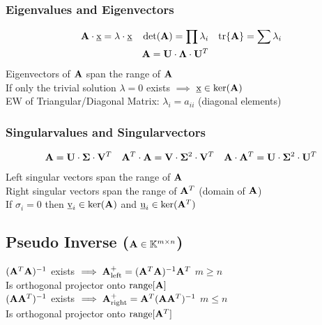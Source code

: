 \begin{mdframed}[style=eqbox]
\subsubsection{Eigenvalues and Eigenvectors}
\begin{align*}
  \mathbf{A} \cdot \underbar{x} = \lambda \cdot \underbar{x} && \det(\mathbf{A}) = \prod \lambda_i && \text{tr}\{\mathbf{A}\} = \sum \lambda_i\\
  &&\mathbf{A} = \mathbf{U} \cdot \mathbf{\Lambda} \cdot \mathbf{U}^{T}&&
\end{align*}
Eigenvectors of $\mathbf{A}$ span the range of $\mathbf{A}$\\
If only the trivial solution $\lambda = 0$ exists $\implies$ $\underbar{x} \in \text{ker}(\mathbf{A})$\\[0.25em]
EW of Triangular/Diagonal Matrix: $\lambda_i = a_{ii}$ (diagonal elements)

\subsubsection{Singularvalues and Singularvectors}
\begin{align*}
  \mathbf{A} = \mathbf{U} \cdot \mathbf{\Sigma} \cdot \mathbf{V}^{T} && \mathbf{A}^{T} \cdot \mathbf{A} = \mathbf{V} \cdot \mathbf{\Sigma}^{2} \cdot \mathbf{V}^{T} && \mathbf{A} \cdot \mathbf{A}^{T} = \mathbf{U} \cdot \mathbf{\Sigma}^{2} \cdot \mathbf{U}^{T}
\end{align*}
Left singular vectors span the range of $\mathbf{A}$\\
Right singular vectors span the range of $\mathbf{A}^{T}$ (domain of $\mathbf{A}$)\\
If $\sigma_i = 0$ then $\underbar{v}_i \in \text{ker}(\mathbf{A})$ and $\underbar{u}_i \in \text{ker}(\mathbf{A}^{T})$

\subsection{Pseudo Inverse ($\mathbf{A} \in \mathbb{K}^{m \times n}$)}
$(\mathbf{A}^T\mathbf{A})^{-1}$ exists $\implies \mathbf{A}^+_{\text{left}} = (\mathbf{A}^T\mathbf{A})^{-1}\mathbf{A}^T$ $m \geq n$\\
Is orthogonal projector onto $\text{range}[\mathbf{A}]$ \\[0.25em]
$(\mathbf{A}\mathbf{A}^T)^{-1}$ exists $\implies \mathbf{A}^+_{\text{right}} = \mathbf{A}^T(\mathbf{A}\mathbf{A}^T)^{-1}$ $m \leq n$\\
Is orthogonal projector onto $\text{range}[\mathbf{A}^T]$


\end{mdframed}
